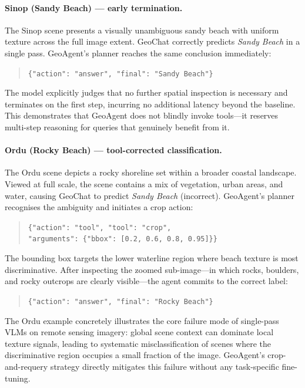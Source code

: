 \documentclass{article}
\begin{document}
\paragraph{Sinop (Sandy Beach) --- early termination.}
The Sinop scene presents a visually unambiguous sandy beach with uniform texture
across the full image extent.  GeoChat correctly predicts \textit{Sandy Beach} in
a single pass.  GeoAgent's planner reaches the same conclusion immediately:
\begin{quote}
  \small\texttt{\{"action": "answer", "final": "Sandy Beach"\}}
\end{quote}
The model explicitly judges that no further spatial inspection is necessary and
terminates on the first step, incurring no additional latency beyond the baseline.
This demonstrates that GeoAgent does not blindly invoke tools---it reserves
multi-step reasoning for queries that genuinely benefit from it.

\paragraph{Ordu (Rocky Beach) --- tool-corrected classification.}
The Ordu scene depicts a rocky shoreline set within a broader coastal landscape.
Viewed at full scale, the scene contains a mix of vegetation, urban areas, and
water, causing GeoChat to predict \textit{Sandy Beach} (incorrect).  GeoAgent's
planner recognises the ambiguity and initiates a crop action:
\begin{quote}
  \small\texttt{\{"action": "tool", "tool": "crop",}\\
  \small\texttt{\phantom{\{}"arguments": \{"bbox": [0.2, 0.6, 0.8, 0.95]\}\}}
\end{quote}
The bounding box targets the lower waterline region where beach texture is most
discriminative.  After inspecting the zoomed sub-image---in which rocks, boulders,
and rocky outcrops are clearly visible---the agent commits to the correct label:
\begin{quote}
  \small\texttt{\{"action": "answer", "final": "Rocky Beach"\}}
\end{quote}
The Ordu example concretely illustrates the core failure mode of single-pass VLMs
on remote sensing imagery: global scene context can dominate local texture signals,
leading to systematic misclassification of scenes where the discriminative region
occupies a small fraction of the image.  GeoAgent's crop-and-requery strategy
directly mitigates this failure without any task-specific fine-tuning.
\end{document}

